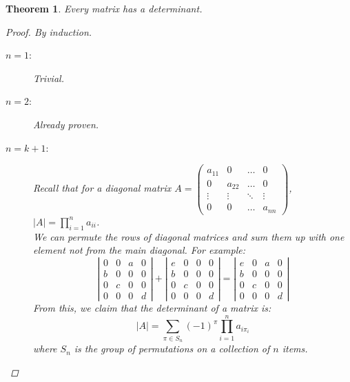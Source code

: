 \documentclass{article}
\newtheorem{theorem}{Theorem}
\theoremstyle{definition}
\begin{document}
\begin{theorem}
	Every matrix has a determinant.

	\begin{proof}
		By induction.
		\begin{description}
			\item[$n=1$:] Trivial.
			\item[$n=2$:] Already proven.
			\item[$n=k+1$:] Recall that for a diagonal matrix \begin{math}
				A=\left(
					\begin{matrix}
						a_{11} & 0 & \dots & 0 \\
						0 & a_{22} & \dots & 0 \\
						\vdots & \vdots & \ddots & \vdots \\
						0 & 0 & \dots & a_{nn}
					\end{matrix}
				\right)
			\end{math}, $|A|=\prod_{i=1}^na_{ii}$. \\
			We can permute the rows of diagonal matrices and sum them up with one element not from the main diagonal. For example:
			\begin{equation*}
				\left|
					\begin{matrix}
						0 & 0 & a & 0 \\
						b & 0 & 0 & 0 \\
						0 & c & 0 & 0 \\
						0 & 0 & 0 & d
					\end{matrix}
				\right| + \left|
					\begin{matrix}
						e & 0 & 0 & 0 \\
						b & 0 & 0 & 0 \\
						0 & c & 0 & 0 \\
						0 & 0 & 0 & d
					\end{matrix}
				\right| = \left|
					\begin{matrix}
						e & 0 & a & 0 \\
						b & 0 & 0 & 0 \\
						0 & c & 0 & 0 \\
						0 & 0 & 0 & d
					\end{matrix}
				\right|
			\end{equation*}
			From this, we claim that the determinant of a matrix is:
			$$|A|=\sum_{\pi\in S_n}(-1)^\pi \prod_{i=1}^n a_{i\pi_i}$$
			where $S_n$ is the group of permutations on a collection of $n$ items.


\end{description}
\end{proof}
\end{theorem}
\end{document}
